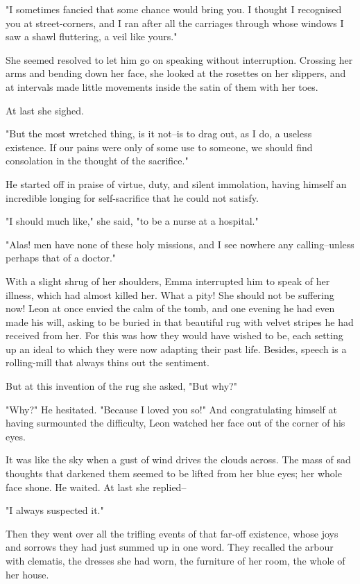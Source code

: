 \documentclass{tufte-book}
\begin{document}
"I sometimes fancied that some chance would bring you. I thought I
recognised you at street-corners, and I ran after all the carriages
through whose windows I saw a shawl fluttering, a veil like yours."

She seemed resolved to let him go on speaking without interruption.
Crossing her arms and bending down her face, she looked at the rosettes
on her slippers, and at intervals made little movements inside the satin
of them with her toes.

At last she sighed.

"But the most wretched thing, is it not--is to drag out, as I do, a
useless existence. If our pains were only of some use to someone, we
should find consolation in the thought of the sacrifice."

He started off in praise of virtue, duty, and silent immolation, having
himself an incredible longing for self-sacrifice that he could not
satisfy.

"I should much like," she said, "to be a nurse at a hospital."

"Alas! men have none of these holy missions, and I see nowhere any
calling--unless perhaps that of a doctor."

With a slight shrug of her shoulders, Emma interrupted him to speak of
her illness, which had almost killed her. What a pity! She should not be
suffering now! Leon at once envied the calm of the tomb, and one evening
he had even made his will, asking to be buried in that beautiful rug
with velvet stripes he had received from her. For this was how they
would have wished to be, each setting up an ideal to which they were now
adapting their past life. Besides, speech is a rolling-mill that always
thins out the sentiment.

But at this invention of the rug she asked, "But why?"

"Why?" He hesitated. "Because I loved you so!" And congratulating
himself at having surmounted the difficulty, Leon watched her face out
of the corner of his eyes.

It was like the sky when a gust of wind drives the clouds across. The
mass of sad thoughts that darkened them seemed to be lifted from her
blue eyes; her whole face shone. He waited. At last she replied--

"I always suspected it."

Then they went over all the trifling events of that far-off existence,
whose joys and sorrows they had just summed up in one word. They
recalled the arbour with clematis, the dresses she had worn, the
furniture of her room, the whole of her house.
\end{document}
